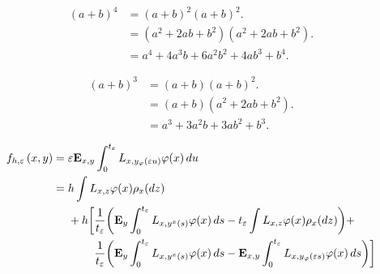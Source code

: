\begin{frame}[fragile]
	\frametitle{\secname}

	\begin{equation}
		\begin{split}
			\left(a+b\right)^{4} & = \left(a+b\right)^{2}\left(a+b\right)^{2}.                 \\
			                     & = \left(a^{2}+2ab+b^{2}\right)\left(a^{2}+2ab+b^{2}\right). \\
			                     & = a^{4}+4a^{3}b+6a^{2}b^{2}+4ab^{3}+b^{4}.
		\end{split}
	\end{equation}

	\begin{equation}
		\begin{split}
			\left(a+b\right)^{3} & = \left(a+b\right)\left(a+b\right)^{2}.         \\
			                     & = \left(a+b\right)\left(a^{2}+2ab+b^{2}\right). \\
			                     & = a^{3}+3a^{2}b+3ab^{2}+b^{3}.
		\end{split}
	\end{equation}

	\begin{equation}
		\begin{split}
			f_{h,\ve}\left(x,y\right) & = \ve\bfE_{x,y}
			\int_{0}^{\tve}
			L_{x,\yvf(\ve u)}\vf(x)\,du                                          \\
			                          & = h\int L_{x,z}\vf(x)\rho_{x}(dz)        \\
			                          & \relphantom{=} {} + h\biggl[
			\frac{1}{\tve}
			\biggl(
			\bfE_{y}\int_{0}^{\tve}
			L_{x, y^x(s)} \vf(x) \,ds
			- \tve \int L_{x, z} \vf(x) \rho_x(dz)
			\biggr) +                                                            \\
			                          & \relphantom{=} \phantom{{} + h \biggl[ }
				\frac{1}{\tve}
				\biggl( \bfE_{y} \int_0^{\tve}
				L_{x, y^x(s)} \vf(x) \,ds
				- \bfE_{x, y} \int_0^{\tve} L_{x, \yvf(\ve s)}
				\vf(x) \,ds
				\biggr) \biggr]
		\end{split}
	\end{equation}
\end{frame}

